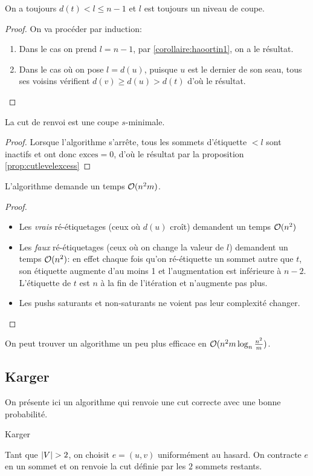 \documentclass[math, info]{cours}
\begin{document}
\begin{lemme}
	On a toujours $d(t) < l \leq n - 1$ et $l$ est toujours un niveau de coupe.
	\label{lemme:haoortin4}
\end{lemme}
\begin{proof}
	On va procéder par induction:
	\begin{enumerate}
		\item Dans le cas on prend $l = n - 1$, par \ref{corollaire:haoortin1}, on a le résultat.
		\item Dans le cas où on pose $l = d(u)$, puisque $u$ est le dernier de son seau, tous ses voisins vérifient $d(v) \geq d(u) > d(t)$ d'où le résultat.
	\end{enumerate}
\end{proof}

\begin{thm}
	La cut de renvoi est une coupe $s$-minimale.
\end{thm}
\begin{proof}
	Lorsque l'algorithme s'arrête, tous les sommets d'étiquette $< l$ sont inactifs et ont donc $\mathrm{exces} = 0$, d'où le résultat par la proposition \ref{prop:cutlevelexcess}
\end{proof}

\begin{thm}
	L'algorithme demande un temps $\mathcal{O}(n^{2}m)$.
\end{thm}
\begin{proof}
	\begin{itemize}
		\item Les \emph{vrais} ré-étiquetages (ceux où $d(u)$ croît) demandent un temps $\mathcal{O}(n^{2})$
		\item Les \emph{faux} ré-étiquetages (ceux où on change la valeur de $l$) demandent un temps $\mathcal{O}(n^{2})$: en effet chaque fois qu'on ré-étiquette un sommet autre que $t$, son étiquette augmente d'au moins 1 et l'augmentation est inférieure à $n - 2$.
		      L'étiquette de $t$ est $n$ à la fin de l'itération et n'augmente pas plus.
		\item Les pushs saturants et non-saturants ne voient pas leur complexité changer.
	\end{itemize}
\end{proof}

On peut trouver un algorithme un peu plus efficace en $\mathcal{O}(n^{2}m\log_{n}\frac{n^{2}}{m})$.

\subsection{Karger}
On présente ici un algorithme qui renvoie une cut correcte avec une bonne probabilité.
\begin{algorithm}
	\caption{Karger}
	Tant que $\left|V\right| > 2$, on choisit $e = (u, v)$ uniformément au hasard. On contracte $e$ en un sommet et on renvoie la cut définie par les $2$ sommets restants.
\end{algorithm}
\end{document}
